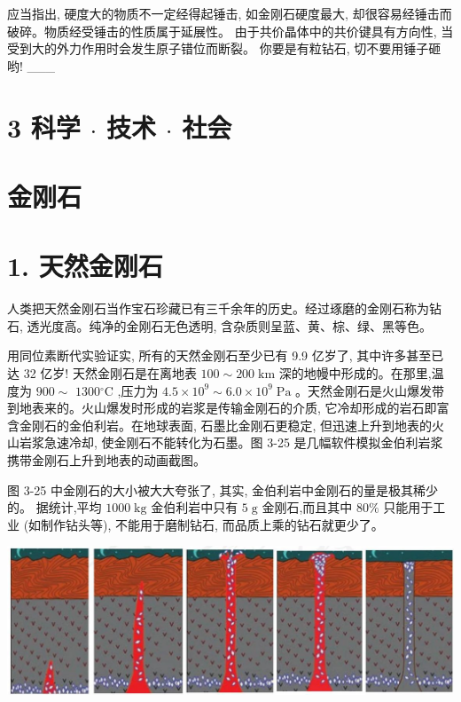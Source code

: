 \documentclass[10pt]{article}
\begin{document}
应当指出, 硬度大的物质不一定经得起锤击, 如金刚石硬度最大, 却很容易经锤击而破碎。物质经受锤击的性质属于延展性。 由于共价晶体中的共价键具有方向性, 当受到大的外力作用时会发生原子错位而断裂。 你要是有粒钻石, 切不要用锤子砸哟! \_\_\_

\section*{3 科学 \(\cdot\) 技术 \(\cdot\) 社会}

\section*{金刚石}

\section*{1. 天然金刚石}

人类把天然金刚石当作宝石珍藏已有三千余年的历史。经过琢磨的金刚石称为钻石, 透光度高。纯净的金刚石无色透明, 含杂质则呈蓝、黄、棕、绿、黑等色。

用同位素断代实验证实, 所有的天然金刚石至少已有 9.9 亿岁了, 其中许多甚至已达 32 亿岁! 天然金刚石是在离地表 \({100} \sim {200}\mathrm{\;{km}}\) 深的地幔中形成的。在那里,温度为 \({900} \sim\) \({1300}{}^{ \circ }\mathrm{C}\) ,压力为 \({4.5} \times {10}^{9} \sim {6.0} \times {10}^{9}\mathrm{\;{Pa}}\) 。天然金刚石是火山爆发带到地表来的。火山爆发时形成的岩浆是传输金刚石的介质, 它冷却形成的岩石即富含金刚石的金伯利岩。在地球表面, 石墨比金刚石更稳定, 但迅速上升到地表的火山岩浆急速冷却, 使金刚石不能转化为石墨。图 3-25 是几幅软件模拟金伯利岩浆携带金刚石上升到地表的动画截图。

图 3-25 中金刚石的大小被大大夸张了, 其实, 金伯利岩中金刚石的量是极其稀少的。 据统计,平均 \({1000}\mathrm{\;{kg}}\) 金伯利岩中只有 \(5\mathrm{\;g}\) 金刚石,而且其中 \({80}\%\) 只能用于工业 (如制作钻头等), 不能用于磨制钻石, 而品质上乘的钻石就更少了。

\begin{center}
\includegraphics[max width=1.0\textwidth]{images/0190e026-5a11-7df7-bd27-54d09026ba7a_86_799813.jpg}
\end{center}
\end{document}
